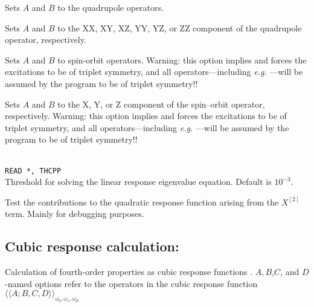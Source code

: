 \begin{description}
\item{}
Sets $A$ and $B$ to the quadrupole operators.

\item{}
Sets $A$ and $B$ to the XX, XY, XZ, YY, YZ, or ZZ component of the
quadrupole operator, respectively.


\item{}
Sets $A$ and $B$ to spin-orbit operators.
Warning: this option implies  and
forces the excitations to be of triplet symmetry,
and all operators---including
{\it e.g.\/} ---will be assumed by the program to be of triplet symmetry!!

\item{}
Sets $A$ and $B$ to the X, Y, or Z component of the spin--orbit
operator, respectively.
Warning: this option implies  and
forces the excitations to be of triplet symmetry,
and all operators---including
{\it e.g.\/} ---will be assumed by the program to be of triplet symmetry!!

\item{}\\
\verb|READ *, THCPP|\\
Threshold for solving the linear response
eigenvalue equation. Default is $10^{-3}$.

\item{}
Test the contributions to the quadratic response function arising from
the $X^{\left[2\right]}$ term. Mainly for debugging purposes.
\end{description}


\subsection{Cubic response calculation: }
Calculation of fourth-order properties as cubic response functions
\cite{pndjovhacpl242,djpnhajcp105,pndjhapdkrthhkcpl253}.
$A,B$,$C$, and $D$-named options refer to the operators in the cubic
response function
$\langle\!\langle A;B,C,D \rangle\!\rangle_{\omega_b,\omega_c,\omega_d}$

